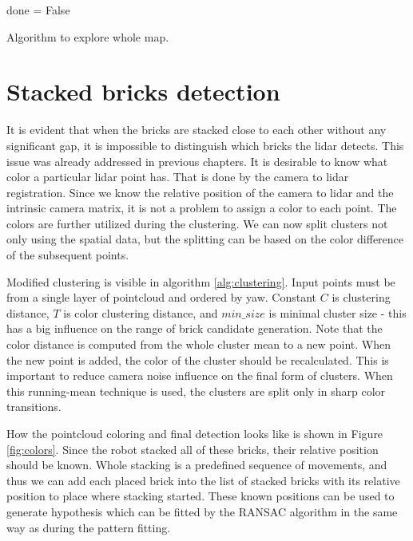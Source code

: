 \begin{algorithm}[H]
	done = False\;
	\caption{Algorithm to explore whole map.}
	\label{alg:exploration}
\end{algorithm}

\section{Stacked bricks detection}
It is evident that when the bricks are stacked close to each other without any significant gap, it is impossible to distinguish which bricks the lidar detects. This issue was already addressed in previous chapters. It is desirable to know what color a particular lidar point has. That is done by the camera to lidar registration. Since we know the relative position of the camera to lidar and the intrinsic camera matrix, it is not a problem to assign a color to each point. The colors are further utilized during the clustering. We can now split clusters not only using the spatial data, but the splitting can be based on the color difference of the subsequent points. 

Modified clustering is visible in algorithm \ref{alg:clustering}. Input points must be from a single layer of pointcloud and ordered by yaw. Constant $C$ is clustering distance, $T$ is color clustering distance, and $min\_size$ is minimal cluster size - this has a big influence on the range of brick candidate generation. Note that the color distance is computed from the whole cluster mean to a new point. When the new point is added, the color of the cluster should be recalculated. This is important to reduce camera noise influence on the final form of clusters. When this running-mean technique is used, the clusters are split only in sharp color transitions. 

How the pointcloud coloring and final detection looks like is shown in Figure  \ref{fig:colors}. Since the robot stacked all of these bricks, their relative position should be known. Whole stacking is a predefined sequence of movements, and thus we can add each placed brick into the list of stacked bricks with its relative position to place where stacking started. These known positions can be used to generate hypothesis which can be fitted by the RANSAC algorithm in the same way as during the pattern fitting. 

